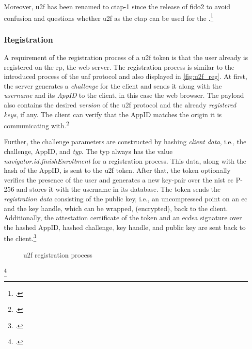 Moreover, \gls{u2f} has been renamed to \gls{ctap}-1 since the release of \gls{fido}2 to avoid confusion and questions whether \gls{u2f} as the \gls{ctap} can be used for the \wa.\footcite[See][4]{ctap2}

\subsubsection{Registration}

A requirement of the registration process of a \gls{u2f} token is that the user already is registered on the \gls{rp}, the web server. The registration process is similar to the introduced process of the \gls{uaf} protocol and also displayed in \autoref{fig:u2f_reg}. At first, the server generates a \textit{challenge} for the client and sends it along with the \textit{username} and its \textit{AppID} to the client, in this case the web browser. The payload also contains the desired \textit{version} of the \gls{u2f} protocol and the already \textit{registered keys}, if any. The client can verify that the AppID matches the origin it is communicating with.\footcites[See][4--5]{u2f-js-api}[See][431]{10.1007/978-3-662-54970-4_25}

Further, the challenge parameters are constructed by hashing \textit{client data}, i.e., the challenge, AppID, and \textit{typ}. The typ always has the value \textit{navigator.id.finishEnrollment} for a registration process. This data, along with the hash of the AppID, is sent to the \gls{u2f} token. After that, the token optionally verifies the presence of the user and generates a new key-pair over the \gls{nist} \gls{ec} P-256 and stores it with the username in its database. The token sends the \textit{registration data} consisting of the public key, i.e., an uncompressed point on an \gls{ec} and the key handle, which can be wrapped, (encrypted), back to the client. Additionally, the attestation certificate of the token and an \gls{ecdsa} signature over the hashed AppID, hashed challenge, key handle, and public key are sent back to the client.\footcites[See][4--5]{u2f-raw-message}[See][70]{10.1007/978-3-319-75650-9_5}

\begin{figure}[hbt]
	\centering
	
	\caption[\gls{u2f} registration process]{\gls{u2f} registration process\footnotemark}
	\label{fig:u2f_reg}
\end{figure}
\footcitetexts[Source: diagram by author, based on][69]{10.1007/978-3-319-75650-9_5}[][428]{10.1007/978-3-662-54970-4_25}

